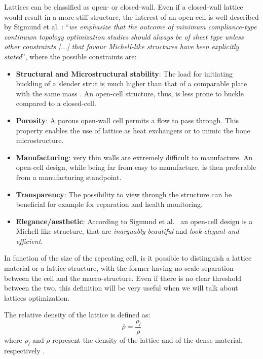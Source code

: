 Lattices can be classified as open- or closed-wall. Even if a closed-wall lattice would result in a more stiff structure, the interest of an open-cell is well described by Sigmund et al. : ``\textit{we emphasize that the outcome of minimum compliance-type continuum topology optimization studies should always be of sheet type unless other constraints [...] that favour Michell-like structures have been explicitly stated}'', where the possible constraints are:
\begin{itemize}
    \item \textbf{Structural and Microstructural stability}: The load for initiating buckling of a slender strut is much higher than that of a comparable plate with the same mass . An open-cell structure, thus, is less prone to buckle compared to a closed-cell.
    \item \textbf{Porosity}: A porous open-wall cell permits a flow to pass through. This property enables the use of lattice as heat exchangers or to mimic the bone microstructure.
    \item \textbf{Manufacturing}: very thin walls are extremely difficult to manufacture. An open-cell design, while being far from easy to manufacture, is then preferable from a manufacturing standpoint. 
    \item \textbf{Transparency}: The possibility to view through the structure can be beneficial for example for reparation and health monitoring.
    \item \textbf{Elegance/aesthetic}: According to Sigmund et al.~\cite{sigmund_non-optimality_2016} an open-cell design is a Michell-like structure, that are \textit{inarguably beautiful} and \textit{look elegant and efficient}.
\end{itemize}

In function of the size of the repeating cell, is it possible to distinguish a lattice material or a lattice structure, with the former having no scale separation between the cell and the macro-structure. Even if there is no clear threshold between the two, this definition will be very useful when we will talk about lattices optimization.

The relative density of the lattice is defined as:
\begin{equation}
    \bar{\rho} = \frac{\rho_l}{\rho}
\end{equation}
where $\rho_l$ and $\rho$ represent the density of the lattice and of the dense material, respectively .

